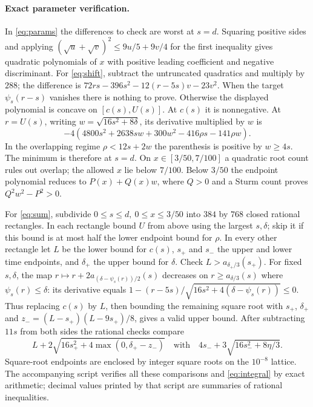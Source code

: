 \paragraph{Exact parameter verification.}
In \eqref{eq:params} the differences to check are worst at \(s=d\). Squaring positive sides and applying
\((\sqrt u+\sqrt v)^2\le9u/5+9v/4\) for the first inequality gives quadratic polynomials of \(x\) with positive leading coefficient and negative discriminant. For \eqref{eq:shift}, subtract the untruncated quadratics and multiply by \(288\); the difference is \(72rs-396s^2-12(r-5s)v-23v^2\). When the target \(\psi_s(r-s)\) vanishes there is nothing to prove. Otherwise the displayed polynomial is concave on \([c(s),U(s)]\). At \(c(s)\) it is nonnegative. At \(r=U(s)\), writing \(w=\sqrt{16s^2+8\delta}\), its derivative multiplied by \(w\) is
\[
 -4(4800s^2+2638sw+300w^2-416\rho s-141\rho w).
\]
In the overlapping regime \(\rho<12s+2w\) the parenthesis is positive by \(w\ge4s\). The minimum is therefore at \(s=d\). On \(x\in[3/50,7/100]\) a quadratic root count rules out overlap; the allowed \(x\) lie below \(7/100\). Below \(3/50\) the endpoint polynomial reduces to \(P(x)+Q(x)w\), where \(Q>0\) and a Sturm count proves \(Q^2w^2-P^2>0\).

For \eqref{eq:sum}, subdivide \(0\le s\le d,\ 0\le x\le3/50\) into \(384\) by \(768\) closed rational rectangles. In each rectangle bound \(U\) from above using the largest \(s,\delta\); skip it if this bound is at most half the lower endpoint bound for \(\rho\). In every other rectangle let \(L\) be the lower bound for \(c(s)\), \(s_+\) and \(s_-\) the upper and lower time endpoints, and \(\delta_+\) the upper bound for \(\delta\). Check \(L>a_{\delta_+/3}(s_+)\). For fixed \(s,\delta\), the map \(r\mapsto r+2a_{(\delta-\psi_s(r))/2}(s)\) decreases on \(r\ge a_{\delta/3}(s)\) where \(\psi_s(r)\le\delta\): its derivative equals \(1-(r-5s)/\sqrt{16s^2+4(\delta-\psi_s(r))}\le0\). Thus replacing \(c(s)\) by \(L\), then bounding the remaining square root with \(s_+\), \(\delta_+\) and \(z_-=(L-s_+)(L-9s_+)/8\), gives a valid upper bound. After subtracting \(11s\) from both sides the rational checks compare
\[
 L+2\sqrt{16s_+^2+4\max(0,\delta_+-z_-)}
 \quad\text{with}\quad 4s_-+3\sqrt{16s_-^2+8\eta/3}.
\]
Square-root endpoints are enclosed by integer square roots on the \(10^{-8}\) lattice. The accompanying script verifies all these comparisons and \eqref{eq:integral} by exact arithmetic; decimal values printed by that script are summaries of rational inequalities.
